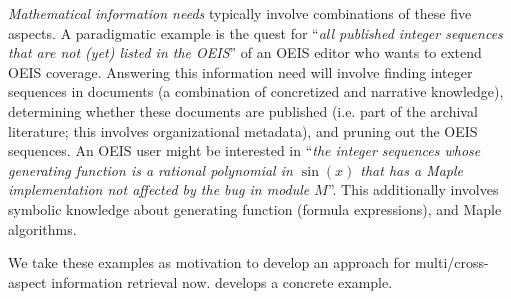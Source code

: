 \emph{Mathematical information needs} typically involve combinations of these five aspects. A paradigmatic example is the quest for ``\emph{all published integer sequences that are not (yet) listed in the OEIS}'' of an OEIS editor who wants to extend OEIS coverage. Answering this information need will involve finding integer sequences in documents (a combination of concretized and narrative knowledge), determining whether these documents are published (i.e. part of the archival literature; this involves organizational metadata), and pruning out the OEIS sequences. An OEIS user might be interested in ``\emph{the integer sequences whose generating function is a rational polynomial in $\sin(x)$ that has a Maple implementation not affected by the bug in module $M$}''. This additionally involves symbolic knowledge about generating function (formula expressions), and Maple algorithms.  

We take these examples as motivation to develop an approach for multi/cross-aspect information retrieval now.
\iflong{} develops a concrete example.\fi%


